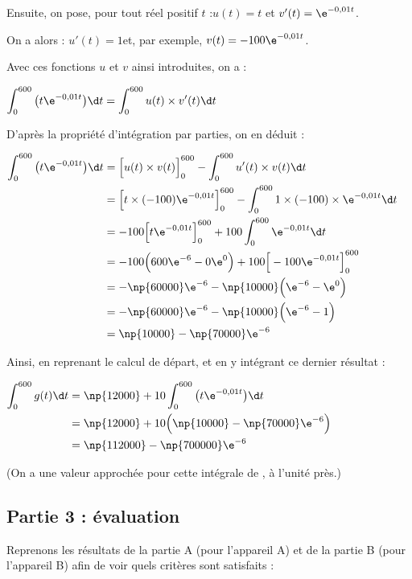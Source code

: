 \begin{enumerate}
Ensuite, on pose, pour tout réel positif $t$ :\quad $u(t) = t$ \quad et \quad $v'(t) = \e^{-0,01t}$.

On a alors : \quad $u'(t) = 1$\quad et, par exemple, \quad $v(t) = -100\e^{-0,01t}$.

Avec ces fonctions $u$ et $v$ ainsi introduites, on a :

$\displaystyle \int_{0}^{600} \big(t\e^{-0,01t}\big) \d t = \int_{0}^{600} u(t)\times v'(t) \d t$

D'après la propriété d'intégration par parties, on en déduit :

	$\aligned[t] \displaystyle \int_{0}^{600} \big(t\e^{-0,01t}\big) \d t
	&= \Big[u(t)\times v(t) \Big]_0^{600} - \int_{0}^{600} u'(t)\times v(t) \d t\\
	&= \Big[t\times (-100)\e^{-0,01t} \Big]_0^{600} - \int_{0}^{600} 1\times( -100)\times \e^{-0,01t} \d t\\
	&= -100 \Big[t\e^{-0,01t} \Big]_0^{600} +100 \int_{0}^{600} \e^{-0,01t} \d t\\
	&= -100 \Big(600\e^{-6} - 0\e^{0}\Big) + 100 \Big[-100\e^{-0,01t}\Big]_{0}^{600}\\
	&= -\np{60000}\e^{-6} - \np{10000} \Big(\e^{-6} - \e^{0}\Big)\\
	&= -\np{60000}\e^{-6} - \np{10000} \Big(\e^{-6} - 1\Big)\\
	&= \np{10000}-\np{70000}\e^{-6}\\
	\endaligned$

Ainsi, en reprenant le calcul de départ, et en y intégrant ce dernier résultat :

$\aligned[t] \displaystyle \int_{0}^{600} g(t) \d t
&= \np{12000} + 10 \int_{0}^{600} \big(t\e^{-0,01t}\big) \d t\\
&= \np{12000} + 10\Big(\np{10000}-\np{70000}\e^{-6}\Big)\\
&=\np{112000} - \np{700000}\e^{-6}	\endaligned$

(On a une valeur approchée pour cette intégrale de , à l'unité près.)
\end{enumerate}

\subsection*{Partie 3 : évaluation}

Reprenons les résultats de la partie A (pour l'appareil A) et de la partie B (pour l'appareil B) afin de voir quels critères sont satisfaits :

